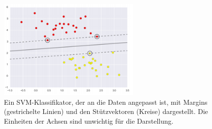 \begin{figure}[H]
  \centering
  \includegraphics[width=70mm,scale=0.7]{SVC2.png}
  \caption{Ein SVM-Klassifikator, der an die Daten angepasst ist, mit Margins (gestrichelte
Linien) und den Stützvektoren (Kreise) dargestellt. Die Einheiten der Achsen sind unwichtig für die Darstellung. \cite{10.5555/3133359}} 
  \label{fig:svc2}
\end{figure}